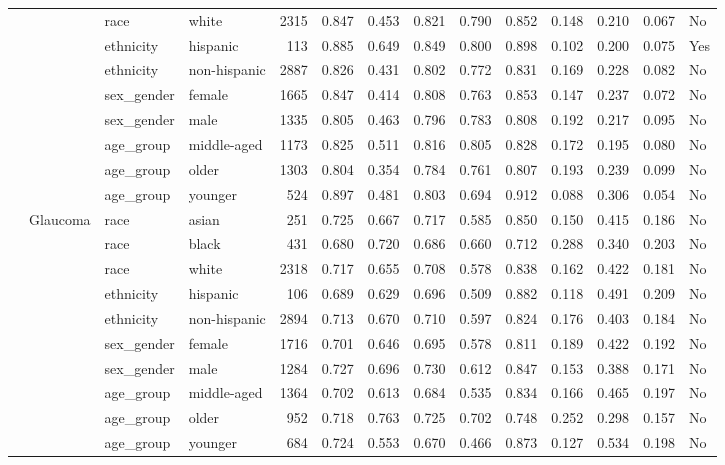 \begin{longtable}{@{}lll l rrrrrrrr@{}}
 &  & race & white & 2315 & 0.847 & 0.453 & 0.821 & 0.790 & 0.852 & 0.148 & 0.210 & 0.067 & No \\
 &  & ethnicity & hispanic & 113 & 0.885 & 0.649 & 0.849 & 0.800 & 0.898 & 0.102 & 0.200 & 0.075 & Yes \\
 &  & ethnicity & non-hispanic & 2887 & 0.826 & 0.431 & 0.802 & 0.772 & 0.831 & 0.169 & 0.228 & 0.082 & No \\
 &  & sex\_gender & female & 1665 & 0.847 & 0.414 & 0.808 & 0.763 & 0.853 & 0.147 & 0.237 & 0.072 & No \\
 &  & sex\_gender & male & 1335 & 0.805 & 0.463 & 0.796 & 0.783 & 0.808 & 0.192 & 0.217 & 0.095 & No \\
 &  & age\_group & middle-aged & 1173 & 0.825 & 0.511 & 0.816 & 0.805 & 0.828 & 0.172 & 0.195 & 0.080 & No \\
 &  & age\_group & older & 1303 & 0.804 & 0.354 & 0.784 & 0.761 & 0.807 & 0.193 & 0.239 & 0.099 & No \\
 &  & age\_group & younger & 524 & 0.897 & 0.481 & 0.803 & 0.694 & 0.912 & 0.088 & 0.306 & 0.054 & No \\
 & Glaucoma & race & asian & 251 & 0.725 & 0.667 & 0.717 & 0.585 & 0.850 & 0.150 & 0.415 & 0.186 & No \\
 &  & race & black & 431 & 0.680 & 0.720 & 0.686 & 0.660 & 0.712 & 0.288 & 0.340 & 0.203 & No \\
 &  & race & white & 2318 & 0.717 & 0.655 & 0.708 & 0.578 & 0.838 & 0.162 & 0.422 & 0.181 & No \\
 &  & ethnicity & hispanic & 106 & 0.689 & 0.629 & 0.696 & 0.509 & 0.882 & 0.118 & 0.491 & 0.209 & No \\
 &  & ethnicity & non-hispanic & 2894 & 0.713 & 0.670 & 0.710 & 0.597 & 0.824 & 0.176 & 0.403 & 0.184 & No \\
 &  & sex\_gender & female & 1716 & 0.701 & 0.646 & 0.695 & 0.578 & 0.811 & 0.189 & 0.422 & 0.192 & No \\
 &  & sex\_gender & male & 1284 & 0.727 & 0.696 & 0.730 & 0.612 & 0.847 & 0.153 & 0.388 & 0.171 & No \\
 &  & age\_group & middle-aged & 1364 & 0.702 & 0.613 & 0.684 & 0.535 & 0.834 & 0.166 & 0.465 & 0.197 & No \\
 &  & age\_group & older & 952 & 0.718 & 0.763 & 0.725 & 0.702 & 0.748 & 0.252 & 0.298 & 0.157 & No \\
 &  & age\_group & younger & 684 & 0.724 & 0.553 & 0.670 & 0.466 & 0.873 & 0.127 & 0.534 & 0.198 & No \\

\end{longtable}
